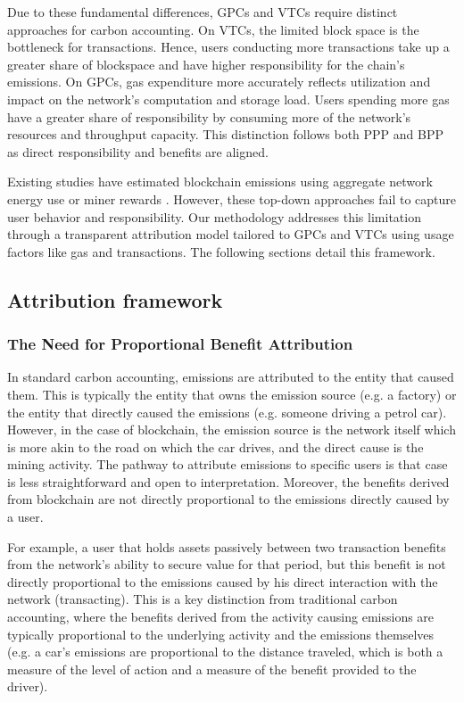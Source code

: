 \documentclass[11pt]{report}
\begin{document}
Due to these fundamental differences, GPCs and VTCs require distinct approaches for carbon accounting. On VTCs, the limited block space is the bottleneck for transactions. Hence, users conducting more transactions take up a greater share of blockspace and have higher responsibility for the chain's emissions. On GPCs, gas expenditure more accurately reflects utilization and impact on the network's computation and storage load. Users spending more gas have a greater share of responsibility by consuming more of the network's resources and throughput capacity. This distinction follows both \ac{PPP} and \ac{BPP} as direct responsibility and benefits are aligned.

Existing studies have estimated blockchain emissions using aggregate network energy use or miner rewards \cite{devriesCryptocurrenciesRoadSustainability2022,devriesRevisitingBitcoinCarbon2022,neumuellerCambridgeBitcoinElectricity2021,mcdonaldEthereumEmissionsBottomup2022}. However, these top-down approaches fail to capture user behavior and responsibility. Our methodology addresses this limitation through a transparent attribution model tailored to GPCs and VTCs using usage factors like gas and transactions. The following sections detail this framework.

\subsection{Attribution framework}
\subsubsection*{The Need for Proportional Benefit Attribution}
In standard carbon accounting, emissions are attributed to the entity that caused them. This is typically the entity that owns the emission source (e.g. a factory) or the entity that directly caused the emissions (e.g. someone driving a petrol car). However, in the case of blockchain, the emission source is the network itself which is more akin to the road on which the car drives, and the direct cause is the mining activity. The pathway to attribute emissions to specific users is that case is less straightforward and open to interpretation. Moreover, the benefits derived from blockchain are not directly proportional to the emissions directly caused by a user.

For example, a user that holds assets passively between two transaction benefits from the network's ability to secure value for that period, but this benefit is not directly proportional to the emissions caused by his direct interaction with the network (transacting). This is a key distinction from traditional carbon accounting, where the benefits derived from the activity causing emissions are typically proportional to the underlying activity and the emissions themselves (e.g. a car's emissions are proportional to the distance traveled, which is both a measure of the level of action and a measure of the benefit provided to the driver).
\end{document}
